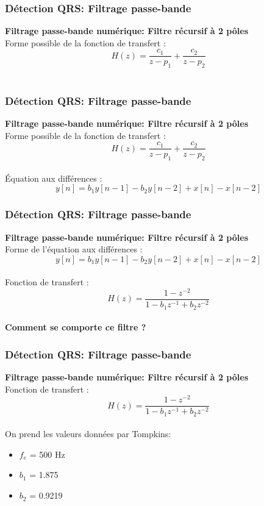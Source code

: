 \documentclass{beamer}
\begin{document}
\begin{frame}
\frametitle{Détection QRS: Filtrage passe-bande}
 \textbf{Filtrage passe-bande numérique: Filtre récursif à  2 pôles}\\
 \vspace{0.3 cm}
 Forme possible de la fonction de transfert :
 \[H(z) = \frac{c_1}{z-p_1} + \frac{c_2}{z-p_2} \]\\
  \vspace{0.3 cm}
\end{frame}



\begin{frame}
\frametitle{Détection QRS: Filtrage passe-bande}
 \textbf{Filtrage passe-bande numérique: Filtre récursif à  2 pôles}\\
 \vspace{0.3 cm}
 Forme possible de la fonction de transfert :
 \[H(z) = \frac{c_1}{z-p_1} + \frac{c_2}{z-p_2} \]\\
  \vspace{0.3 cm}
  \'Equation aux différences :
 \[y[n] = b_1 y[n-1] - b_2 y[n-2] + x[n] - x[n-2] \]  
\end{frame}

\begin{frame}
\frametitle{Détection QRS: Filtrage passe-bande}
 \textbf{Filtrage passe-bande numérique: Filtre récursif à  2 pôles}\\

  Forme de l'équation aux différences :
 \[y[n] = b_1 y[n-1] - b_2 y[n-2] + x[n] - x[n-2] \]  \\
  \vspace{0.3 cm}
  Fonction de transfert :
   \[H(z) = \frac{1 - z^{-2}}{1 - b_1 z^{-1} + b_2 z^{-2}} \]  \\
  \vspace{0.3cm}
 \textbf{Comment se comporte ce filtre ?}
\end{frame}

\begin{frame}
\frametitle{Détection QRS: Filtrage passe-bande}
 \textbf{Filtrage passe-bande numérique: Filtre récursif à  2 pôles}\\

  \vspace{0.3 cm}
  Fonction de transfert :
   \[H(z) = \frac{1 - z^{-2}}{1 - b_1 z^{-1} + b_2 z^{-2}} \]  \\
  \vspace{0.3cm}
 On prend les valeurs données par Tompkins:
 \begin{itemize}
 \item $f_e$ = 500 Hz
 \item $b_1$ = 1.875
 \item $b_2$ = 0.9219
 \end{itemize}
\end{frame}
\end{document}
